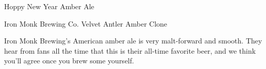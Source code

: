 \begin{recipie}{Hoppy New Year Amber Ale}
\begin{ingredientsblock}
\begin{yeasts}
\end{yeasts}

\end{ingredientsblock}

\end{recipie}

\begin{recipie}{Iron Monk Brewing Co. Velvet Antler Amber Clone}

\begin{aboutblock}
Iron Monk Brewing's American amber ale is very malt-forward and smooth. They
hear from fans all the time that this is their all-time favorite beer, and we think
you’ll agree once you brew some yourself. \sourceaha
\end{aboutblock}


\begin{methodandtiming}
 
\begin{mashsteps}
\end{mashsteps}

\begin{fermentationsteps}
\end{fermentationsteps}

\end{methodandtiming}

\pagebreak

\begin{ingredientsblock}

\begin{malts}
\end{malts}

\begin{hops}
\end{hops}

\begin{yeasts}
\end{yeasts}


\end{ingredientsblock}
\end{recipie}
